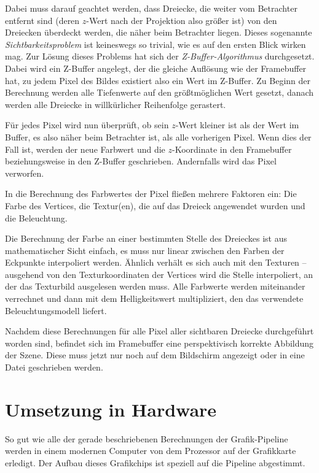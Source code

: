 Dabei muss darauf geachtet werden, dass Dreiecke, die weiter vom Betrachter entfernt sind (deren $z$-Wert nach der Projektion also größer ist) von den Dreiecken überdeckt werden, die näher beim Betrachter liegen. Dieses sogenannte \emph{Sichtbarkeitsproblem} ist keineswegs so trivial, wie es auf den ersten Blick wirken mag. Zur Lösung dieses Problems hat sich der \emph{Z-Buffer-Algorithmus} durchgesetzt. Dabei wird ein Z-Buffer angelegt, der die gleiche Auflösung wie der Framebuffer hat, zu jedem Pixel des Bildes existiert also ein Wert im Z-Buffer. Zu Beginn der Berechnung werden alle Tiefenwerte auf den größtmöglichen Wert gesetzt, danach werden alle Dreiecke in willkürlicher Reihenfolge gerastert.

Für jedes Pixel wird nun überprüft, ob sein $z$-Wert kleiner ist als der Wert im Buffer, es also näher beim Betrachter ist, als alle vorherigen Pixel. Wenn dies der Fall ist, werden der neue Farbwert und die $z$-Koordinate in den Framebuffer beziehungsweise in den Z-Buffer geschrieben. Andernfalls wird das Pixel verworfen.

In die Berechnung des Farbwertes der Pixel fließen mehrere Faktoren ein: Die Farbe des Vertices, die Textur(en), die auf das Dreieck angewendet wurden und die Beleuchtung.

\label{lighting}
Die Berechnung der Farbe an einer bestimmten Stelle des Dreieckes ist aus mathematischer Sicht einfach, es muss nur linear zwischen den Farben der Eckpunkte interpoliert werden. Ähnlich verhält es sich auch mit den Texturen -- ausgehend von den Texturkoordinaten der Vertices wird die Stelle interpoliert, an der das Texturbild ausgelesen werden muss. Alle Farbwerte werden miteinander verrechnet und dann mit dem Helligkeitswert multipliziert, den das verwendete Beleuchtungsmodell liefert.


Nachdem diese Berechnungen für alle Pixel aller sichtbaren Dreiecke durchgeführt worden sind, befindet sich im Framebuffer eine perspektivisch korrekte Abbildung der Szene. Diese muss jetzt nur noch auf dem Bildschirm angezeigt oder in eine Datei geschrieben werden.

\section{Umsetzung in Hardware}
So gut wie alle der gerade beschriebenen Berechnungen der Grafik-Pipeline werden in einem modernen Computer von dem Prozessor auf der Grafikkarte erledigt. Der Aufbau dieses Grafikchips ist speziell auf die Pipeline abgestimmt.

